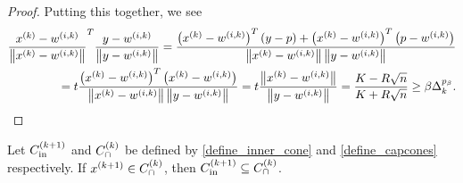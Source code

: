 \begin{proof}
Putting this together, we see
\begin{align*}
\frac{x^{(k)} - {w^{(i, k)}}}{\left\|x^{(k)} - {w^{(i, k)}}\right\|}^T\frac{y - {w^{(i, k)}}}{\left\|y - {w^{(i, k)}}\right\|} 
= \frac{\left(x^{(k)} - {w^{(i, k)}}\right) ^T\left(y - p\right) + \left(x^{(k)} - {w^{(i, k)}}\right)^T\left(p - {w^{(i, k)}}\right)}{\left\|x^{(k)} - {w^{(i, k)}}\right\|\left\|y - {w^{(i, k)}}\right\|} \\
= t\frac{\left(x^{(k)} - {w^{(i, k)}}\right)^T\left(x^{(k)} - {w^{(i, k)}}\right)}{\left\|x^{(k)} - {w^{(i, k)}}\right\|\left\|y - {w^{(i, k)}}\right\|}
= t \frac{\left\|x^{(k)} - {w^{(i, k)}}\right\|}{\left\|y - {w^{(i, k)}}\right\|}
= \frac {K - R\sqrt{n}}{K + R\sqrt{n}} \ge \beta \Delta_k^{p_{\beta}}.
\end{align*}
\end{proof}

\begin{lemma}
\label{inner_cone_inside_each_cone}
Let ${C^{(k+1)}_{\textrm{in}}}$ and ${C^{(k)}_{\cap}}$ be defined by \cref{define_inner_cone} and \cref{define_capcones} respectively.
If 
${{x}^{(k+1)}} \in {C^{(k)}_{\cap}}$, then ${C^{(k+1)}_{\textrm{in}}} \subseteq {C^{(k)}_{\cap}}$.
\end{lemma}

